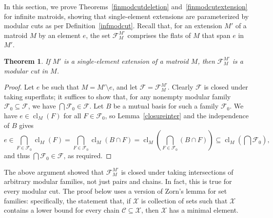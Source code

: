 \documentclass{amsart}
\theoremstyle{plain}
\newtheorem{theorem}{Theorem}[section]
\theoremstyle{definition}
\newcommand{\cC}{\mathcal{C}}
\newcommand{\cF}{\mathcal{F}}
\newcommand{\cX}{\mathcal{X}}
\DeclareMathOperator{\cl}{cl}
\newcommand{\del}{\!\setminus\!}
\newcommand{\br}[1]{\left(#1\right)}
\renewcommand{\ss}{\subseteq}
\begin{document}



In this section, we prove Theorems~\ref{finmodcutdeletion} and~\ref{finmodcutextension}
for infinite matroids, showing that single-element extensions 
are parameterized by modular cuts as per Definition~\ref{infmodcut}. 
Recall that, for an extension $M'$ of a matroid $M$ by an element $e$,
the set $\cF_M^{M'}$ comprises the flats of $M$ that span $e$ in $M'$.  

\begin{theorem}\label{finmodcutdeletioninf}
  If $M'$ is a single-element extension of a matroid $M$,
  then $\cF_{M}^{M'}$ is a modular cut in $M$. 
\end{theorem}
\begin{proof}
  Let $e$ be such that $M = M' \del e$, and let $\cF = \cF_{M}^{M'}$.
  Clearly $\cF$ is closed under taking superflats; it suffices to show that, 
  for any nonempty modular family $\cF_0 \ss \cF$, we have $\bigcap \cF_0 \in \cF$. 
  Let $B$ be a mutual basis for such a family $\cF_0$. 
  We have $e \in \cl_M(F)$ for all $F \in \cF_0$, 
  so Lemma~\ref{closureinter} and the independence of $B$ gives 
  \[e \in \bigcap_{F \in \cF_0} \cl_M(F) = \bigcap_{F \in \cF_0} \cl_M(B \cap F) = 
    \cl_M\br{\bigcap_{F \in \cF_0} (B \cap F)} \ss \cl_M\br{\bigcap \cF_0},\] 
  and thus $\bigcap \cF_0 \in \cF$, as required. 
\end{proof}

The above argument showed that $\cF_{M}^{M'}$ is closed under taking intersections of 
arbitrary modular families, not just pairs and chains. In fact, this is true for every modular cut. 
The proof below uses a version of Zorn's lemma for set families: specifically, 
the statement that, if $\cX$ is collection of sets such that $\cX$ 
contains a lower bound for every chain $\cC \ss \cX$, 
then $\cX$ has a minimal element. 
\end{document}
